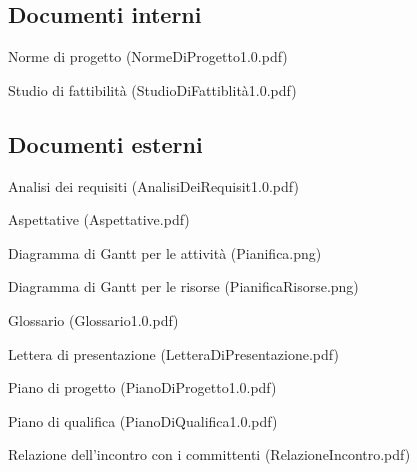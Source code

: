 \subsection{Documenti interni}
\begin{list}{-}{}
\item Norme di progetto (NormeDiProgetto1.0.pdf)
\item Studio di fattibilit\`a (StudioDiFattiblit\`a1.0.pdf)
\end{list}
\subsection{Documenti esterni}
\begin{list}{-}{}
\item Analisi dei requisiti (AnalisiDeiRequisit1.0.pdf)
\item Aspettative (Aspettative.pdf)
\item Diagramma di Gantt per le attivit\`a (Pianifica.png)
\item Diagramma di Gantt per le risorse (PianificaRisorse.png)
\item Glossario (Glossario1.0.pdf)
\item Lettera di presentazione (LetteraDiPresentazione.pdf)
\item Piano di progetto (PianoDiProgetto1.0.pdf)
\item Piano di qualifica (PianoDiQualifica1.0.pdf)
\item Relazione dell'incontro con i committenti (RelazioneIncontro.pdf)
\end{list}


